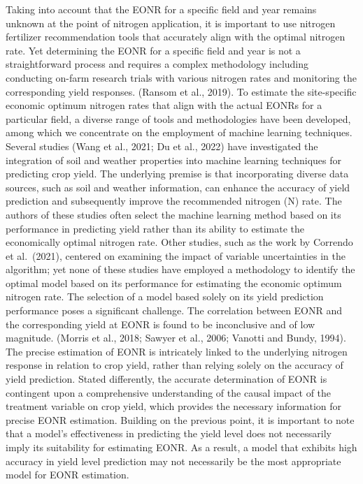 \documentclass[
  12pt,
]{article}
\begin{document}
Taking into account that the EONR for a specific field and year remains unknown at the point of nitrogen application, it is important to use nitrogen fertilizer recommendation tools that accurately align with the optimal nitrogen rate. Yet determining the EONR for a specific field and year is not a straightforward process and requires a complex methodology including conducting on-farm research trials with various nitrogen rates and monitoring the corresponding yield responses. (Ransom et al., 2019). To estimate the site-specific economic optimum nitrogen rates that align with the actual EONRs for a particular field, a diverse range of tools and methodologies have been developed, among which we concentrate on the employment of machine learning techniques. Several studies (Wang et al., 2021; Du et al., 2022) have investigated the integration of soil and weather properties into machine learning techniques for predicting crop yield. The underlying premise is that incorporating diverse data sources, such as soil and weather information, can enhance the accuracy of yield prediction and subsequently improve the recommended nitrogen (N) rate. The authors of these studies often select the machine learning method based on its performance in predicting yield rather than its ability to estimate the economically optimal nitrogen rate. Other studies, such as the work by Correndo et al.~(2021), centered on examining the impact of variable uncertainties in the algorithm; yet none of these studies have employed a methodology to identify the optimal model based on its performance for estimating the economic optimum nitrogen rate.
The selection of a model based solely on its yield prediction performance poses a significant challenge. The correlation between EONR and the corresponding yield at EONR is found to be inconclusive and of low magnitude. (Morris et al., 2018; Sawyer et al., 2006; Vanotti and Bundy, 1994).
The precise estimation of EONR is intricately linked to the underlying nitrogen response in relation to crop yield, rather than relying solely on the accuracy of yield prediction. Stated differently, the accurate determination of EONR is contingent upon a comprehensive understanding of the causal impact of the treatment variable on crop yield, which provides the necessary information for precise EONR estimation. Building on the previous point, it is important to note that a model's effectiveness in predicting the yield level does not necessarily imply its suitability for estimating EONR. As a result, a model that exhibits high accuracy in yield level prediction may not necessarily be the most appropriate model for EONR estimation.
\end{document}
